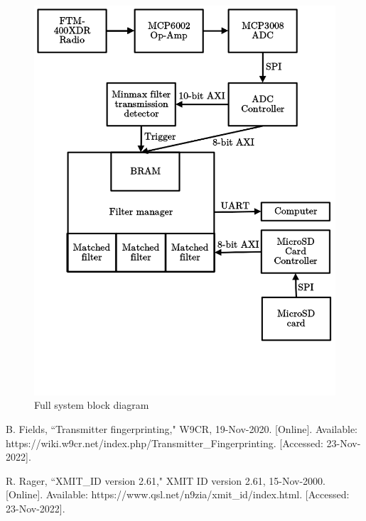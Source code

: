 \documentclass[conference]{IEEEtran}
\begin{document}
\begin{figure}
    \includegraphics[width=\textwidth]{Block_Diagram.png}
    \caption{Full system block diagram}
    \label{block_diagram}
\end{figure}

\begin{thebibliography}{00}
 B. Fields, ``Transmitter fingerprinting," W9CR, 19-Nov-2020. [Online]. Available: https://wiki.w9cr.net/index.php/Transmitter\_Fingerprinting. [Accessed: 23-Nov-2022].

 R. Rager, ``XMIT\_ID version 2.61," XMIT ID version 2.61, 15-Nov-2000. [Online]. Available: https://www.qsl.net/n9zia/xmit\_id/index.html. [Accessed: 23-Nov-2022].
\end{thebibliography}

\vspace{12pt}
\end{document}
